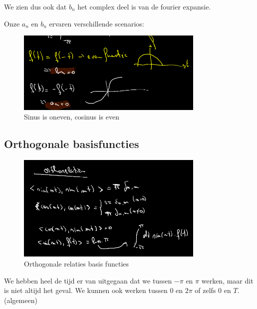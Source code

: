 \documentclass[a4paper]{report}
\begin{document}
We zien dus ook dat $b_n$ het complex deel is van de fourier expansie.

Onze $a_n$ en $b_n$ ervaren verschillende scenarios:

\begin{figure}[H]
	\centering
	\includegraphics[width=0.8\textwidth]{assets/a_n_b_n_even_oneven.png}
	\caption{Sinus is oneven, cosinus is even}
	\label{fig:a_n_b_n_even_oneven}
\end{figure}

\subsection{Orthogonale basisfuncties}

\begin{figure}[H]
	\centering
	\includegraphics[width=0.8\textwidth]{assets/ortho_relaties_basis_functies.png}
	\caption{Orthogonale relaties basis functies}
	\label{fig:ortho_relaties_basis_functies}
\end{figure}

We hebben heel de tijd er van uitgegaan dat we tussen $-\pi$ en $\pi$ werken, maar dit is niet altijd het geval. We kunnen ook werken tussen $0$ en $2\pi$ of zelfs $0$ en $T$. (algemeen)
\end{document}
